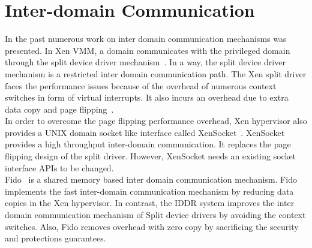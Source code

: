 \section{Inter-domain Communication}
\label{sec:interdomain}
In the past numerous work on inter domain communication mechanisms was presented. In Xen VMM, a domain communicates with the privileged domain through the split device driver mechanism~\cite{Fraser04safehardware}. In a way, the split device driver mechanism is a restricted inter domain communication path. The Xen split driver faces the performance issues because of the overhead of numerous context switches in form of virtual interrupts. It also incurs an overhead due to extra data copy and page flipping~\cite{Zhang:2007:XHI:1516124.1516138}. 
\\[3mm]
In order to overcome the page flipping performance overhead, Xen hypervisor also provides a UNIX domain socket like interface called XenSocket~\cite{Zhang:2007:XHI:1516124.1516138}. XenSocket provides a high throughput inter-domain communication. It replaces the page flipping design of the split driver. However, XenSocket needs an existing socket interface APIs to be changed. 
\\[3mm]
Fido~\cite{Burtsev:2009:FFI:1855807.1855832} is a shared memory based inter domain communication mechanism. Fido implements the fast inter-domain communication mechanism by reducing data copies in the Xen hypervisor. In contrast, the IDDR system improves the inter domain communication mechanism of Split device drivers by avoiding the context switches. Also, Fido removes overhead with zero copy by sacrificing the security and protections guarantees.
\\[3mm]

